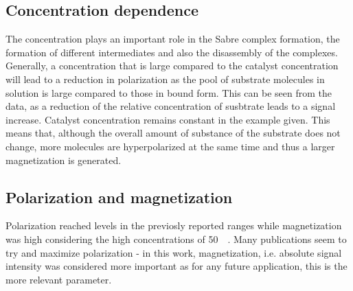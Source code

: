         \subsection{Concentration dependence}
            The concentration plays an important role in the Sabre complex formation, the formation of different intermediates and also the disassembly of the complexes. Generally, a concentration that is large compared to the catalyst concentration will lead to a reduction in polarization as the pool of substrate molecules in solution is large compared to those in bound form. This can be seen from the data, as a reduction of the relative concentration of susbtrate leads to a signal increase. Catalyst concentration remains constant in the example given. This means that, although the overall amount of substance of the substrate does not change, more molecules are hyperpolarized at the same time and thus a larger magnetization is generated.
        \subsection{Polarization and magnetization}
            Polarization reached levels in the previosly reported ranges while magnetization was high considering the high concentrations of \SI{50}{\milli\molar}. Many publications seem to try and maximize polarization - in this work, magnetization, i.e. absolute signal intensity was considered more important as for any future application, this is the more relevant parameter.
